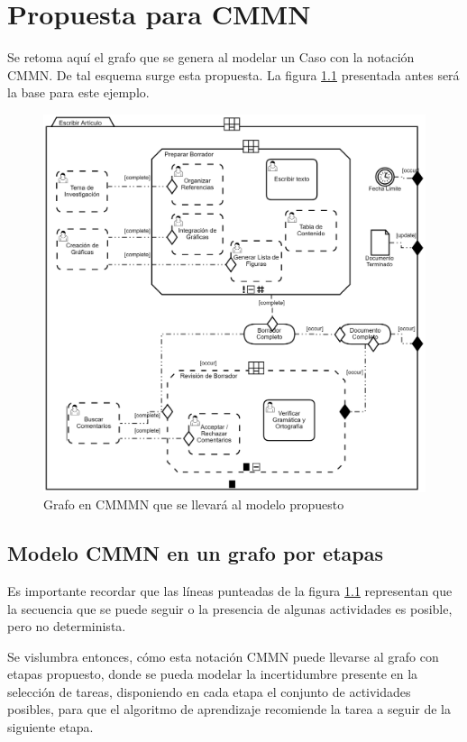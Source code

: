 \chapter{Propuesta para CMMN}
\label{aplica}

Se retoma aquí el grafo que se genera al modelar un Caso con la notación CMMN. De tal esquema surge esta propuesta. La figura \ref{CMMN_modelo} presentada antes será la base para este ejemplo. 

\begin{figure}[h]
  \centering
    \includegraphics[scale=0.25]{ModeloCMM.png}
  \caption[Modelo CMMN]{Grafo en CMMMN que se llevará al modelo propuesto}
  \label{CMMN_modelo}
\end{figure}


\section{Modelo CMMN en un grafo por etapas}

Es importante recordar que las líneas punteadas de la figura \ref{CMMN_modelo} representan que la secuencia que se puede seguir o la presencia de algunas actividades es posible, pero no determinista.

Se vislumbra entonces, cómo esta notación CMMN puede llevarse al grafo con etapas propuesto, donde se pueda modelar la incertidumbre presente en la selección de tareas, disponiendo en cada etapa el conjunto de actividades posibles, para que el algoritmo de aprendizaje recomiende la tarea a seguir de la siguiente etapa.

